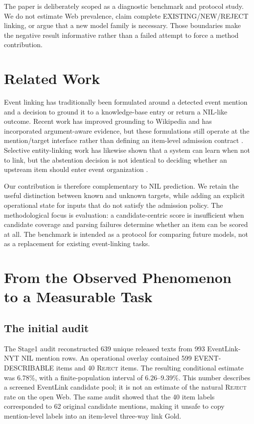 \documentclass[5p,times]{elsarticle}
\newcommand{\reject}{\mbox{\textsc{Reject}}}
\begin{document}
The paper is deliberately scoped as a diagnostic benchmark and protocol study. We do not estimate Web prevalence, claim complete EXISTING/NEW/REJECT linking, or argue that a new model family is necessary. Those boundaries make the negative result informative rather than a failed attempt to force a method contribution.

\section{Related Work}
\label{sec:related}

Event linking has traditionally been formulated around a detected event mention and a decision to ground it to a knowledge-base entry or return a NIL-like outcome. Recent work has improved grounding to Wikipedia and has incorporated argument-aware evidence, but these formulations still operate at the mention/target interface rather than defining an item-level admission contract \citep{eventlinking2023,argumentaware2024}. Selective entity-linking work has likewise shown that a system can learn when not to link, but the abstention decision is not identical to deciding whether an upstream item should enter event organization \citep{learnnotlink2023}.

Our contribution is therefore complementary to NIL prediction. We retain the useful distinction between known and unknown targets, while adding an explicit operational state for inputs that do not satisfy the admission policy. The methodological focus is evaluation: a candidate-centric score is insufficient when candidate coverage and parsing failures determine whether an item can be scored at all. The benchmark is intended as a protocol for comparing future models, not as a replacement for existing event-linking tasks.

\section{From the Observed Phenomenon to a Measurable Task}
\label{sec:phenomenon}

\subsection{The initial audit}

The Stage1 audit reconstructed 639 unique released texts from 993 EventLink-NYT NIL mention rows. An operational overlay contained 599 EVENT-DESCRIBABLE items and 40 \reject{} items. The resulting conditional estimate was 6.78\%, with a finite-population interval of 6.26--9.39\%. This number describes a screened EventLink candidate pool; it is not an estimate of the natural \reject{} rate on the open Web. The same audit showed that the 40 item labels corresponded to 62 original candidate mentions, making it unsafe to copy mention-level labels into an item-level three-way link Gold.
\end{document}
